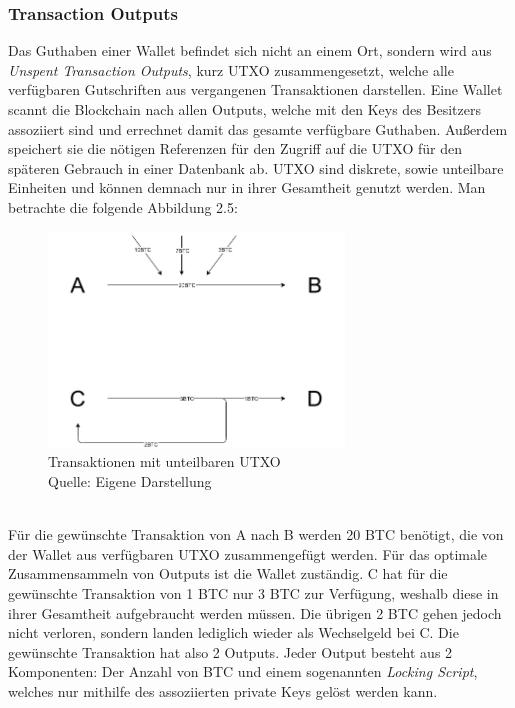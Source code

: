 \subsubsection{Transaction Outputs}
Das Guthaben einer Wallet befindet sich nicht an einem Ort, sondern wird aus \emph{Unspent Transaction Outputs}, kurz UTXO zusammengesetzt, welche alle verfügbaren Gutschriften aus vergangenen Transaktionen darstellen.
Eine Wallet scannt die Blockchain nach allen Outputs, welche mit den Keys des Besitzers assoziiert sind und errechnet damit das gesamte verfügbare Guthaben. Außerdem speichert sie die nötigen Referenzen für den Zugriff auf die UTXO für den späteren Gebrauch in einer Datenbank ab. UTXO sind diskrete, sowie unteilbare Einheiten und können demnach nur in ihrer Gesamtheit genutzt werden. Man betrachte die folgende Abbildung 2.5:
\begin{figure}[htpb]
	\centering
	\includegraphics[width=0.7\textwidth]{images/UTXO.png}
	\caption{Transaktionen mit unteilbaren UTXO\\
	Quelle: Eigene Darstellung}
	\label{6braun:fig:Transaktionen}
\end{figure}\\
Für die gewünschte Transaktion von A nach B werden 20 BTC benötigt, die von der Wallet aus verfügbaren UTXO zusammengefügt werden. 
Für das optimale Zusammensammeln von Outputs ist die Wallet zuständig.
C hat für die gewünschte Transaktion von 1 BTC nur 3 BTC zur Verfügung, weshalb diese in ihrer Gesamtheit aufgebraucht werden müssen.
Die übrigen 2 BTC gehen jedoch nicht verloren, sondern landen lediglich wieder als Wechselgeld bei C. 
Die gewünschte Transaktion hat also 2 Outputs.
Jeder Output besteht aus 2 Komponenten: Der Anzahl von BTC und einem sogenannten \emph{Locking Script}, welches nur mithilfe des assoziierten private Keys gelöst werden kann.

